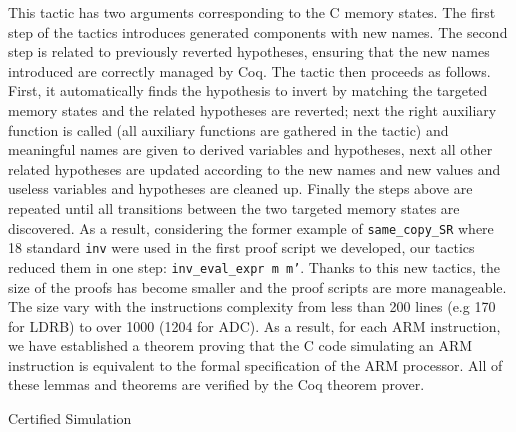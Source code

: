 \documentclass[twocolumn]{article}
\makeatletter
\def\section{\@startsection {section}{1}{\z@}{20pt plus 2pt minus 2pt}
{8pt plus 2pt minus 2pt}{\centering\normalsize\sc
\edef\@svsec{\thesection.\ }}}
\def\thesection{\Roman{section}}
\newcommand{\coqdockw}[1]{\texttt{#1}}
\newcommand{\inv}{\coqdockw{inv}\xspace}
\makeatother
\begin{document}
This tactic has two arguments corresponding to the C memory states.
The first step of the tactics introduces generated components with new
names.  The second step is related to previously reverted hypotheses,
ensuring that the new names introduced are correctly managed by Coq.
The tactic then proceeds as follows. First, it automatically finds the
hypothesis to invert by matching the targeted memory states
and the related hypotheses are reverted; next the right auxiliary
function is called (all auxiliary functions are gathered in the
tactic) and meaningful names are given to derived variables and
hypotheses, next all other related hypotheses are updated according to the new names
and new values and useless variables and hypotheses are cleaned up.
Finally the steps above are repeated until all transitions between
the two targeted memory states are discovered.
\noindent
As a result, considering the former example of \texttt{same\_copy\_SR}
where 18 standard \inv were used in the first proof script we
developed, our tactics reduced them in one step:
\texttt{inv\_eval\_expr~m~m'}.  Thanks to this new tactics, the size
of the proofs has become smaller and the proof scripts are more
manageable. The size vary with the instructions complexity from less
than 200 lines (e.g 170 for LDRB) to over 1000 (1204 for ADC).  As a
result, for each ARM instruction, we have established a theorem
proving that the C code simulating an ARM instruction is equivalent to
the formal specification of the ARM processor. All of these lemmas and
theorems are verified by the Coq theorem prover.

\section{Certified Simulation}
\end{document}
